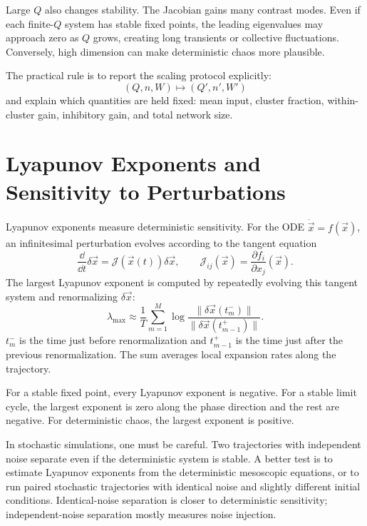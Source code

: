 Large $Q$ also changes stability. The Jacobian gains many contrast modes. Even if each finite-$Q$ system has stable fixed points, the leading eigenvalues may approach zero as $Q$ grows, creating long transients or collective fluctuations. Conversely, high dimension can make deterministic chaos more plausible.

The practical rule is to report the scaling protocol explicitly:
%
\begin{equation}
  (Q,n,W)\mapsto(Q',n',W')
  \label{eq:scaling-protocol}
\end{equation}
%
and explain which quantities are held fixed: mean input, cluster fraction, within-cluster gain, inhibitory gain, and total network size.

\section{Lyapunov Exponents and Sensitivity to Perturbations}
\label{sec:lyapunov-exponents-sensitivity}

Lyapunov exponents measure deterministic sensitivity. For the ODE $\dot{\vec x}=f(\vec x)$, an infinitesimal perturbation evolves according to the tangent equation
%
\begin{equation}
  \frac{\dd}{\dd t}\delta\vec x
  =
  \mathcal{J}(\vec x(t))\delta\vec x,
  \qquad
  \mathcal{J}_{ij}(\vec x)=\frac{\partial f_i}{\partial x_j}(\vec x).
  \label{eq:tangent-linear-system}
\end{equation}
%
The largest Lyapunov exponent is computed by repeatedly evolving this tangent system and renormalizing $\delta\vec x$:
%
\begin{equation}
  \lambda_{\max}
  \approx
  \frac{1}{T}
  \sum_{m=1}^{M}
  \log
  \frac{\|\delta\vec x(t_m^-)\|}{\|\delta\vec x(t_{m-1}^+)\|}.
  \label{eq:numerical-lyapunov}
\end{equation}
%
$t_m^-$ is the time just before renormalization and $t_{m-1}^+$ is the time just after the previous renormalization. The sum averages local expansion rates along the trajectory.

For a stable fixed point, every Lyapunov exponent is negative. For a stable limit cycle, the largest exponent is zero along the phase direction and the rest are negative. For deterministic chaos, the largest exponent is positive.

In stochastic simulations, one must be careful. Two trajectories with independent noise separate even if the deterministic system is stable. A better test is to estimate Lyapunov exponents from the deterministic mesoscopic equations, or to run paired stochastic trajectories with identical noise and slightly different initial conditions. Identical-noise separation is closer to deterministic sensitivity; independent-noise separation mostly measures noise injection.

